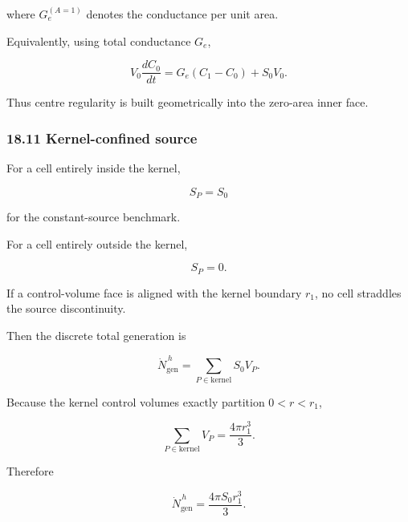 \documentclass[11pt,a4paper]{article}
\begin{document}
where $G_e^{(A=1)}$ denotes the conductance per unit area.

Equivalently, using total conductance $G_e$,

\begin{equation}
\boxed{
V_0\frac{dC_0}{dt}
=
G_e(C_1-C_0)
+
S_0V_0.
}
\tag{TRISO-FV-169}
\label{eq:triso-fv-169}
\end{equation}

Thus centre regularity is built geometrically into the zero-area inner face.

\subsubsection*{18.11 Kernel-confined source}

For a cell entirely inside the kernel,

\begin{equation}
S_P=S_0
\tag{TRISO-FV-170}
\label{eq:triso-fv-170}
\end{equation}

for the constant-source benchmark.

For a cell entirely outside the kernel,

\begin{equation}
S_P=0.
\tag{TRISO-FV-171}
\label{eq:triso-fv-171}
\end{equation}

If a control-volume face is aligned with the kernel boundary $r_1$, no cell straddles the source discontinuity.

Then the discrete total generation is

\begin{equation}
\dot N_{\mathrm{gen}}^{\,h}
=
\sum_{P\in\mathrm{kernel}}
S_0V_P.
\tag{TRISO-FV-172}
\label{eq:triso-fv-172}
\end{equation}

Because the kernel control volumes exactly partition $0<r<r_1$,

\begin{equation}
\sum_{P\in\mathrm{kernel}}V_P
=
\frac{4\pi r_1^3}{3}.
\tag{TRISO-FV-173}
\label{eq:triso-fv-173}
\end{equation}

Therefore

\begin{equation}
\boxed{
\dot N_{\mathrm{gen}}^{\,h}
=
\frac{4\pi S_0r_1^3}{3}.
}
\tag{TRISO-FV-174}
\label{eq:triso-fv-174}
\end{equation}
\end{document}
